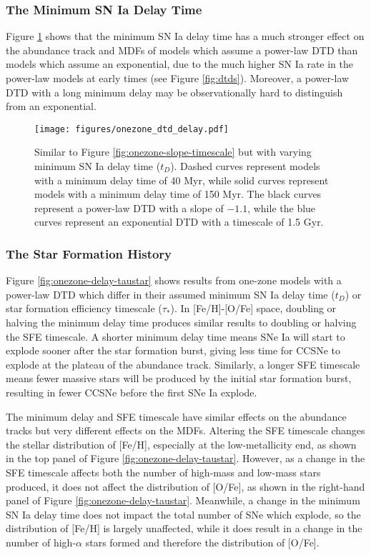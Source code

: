 \documentclass[twocolumn]{aastex631}
\begin{document}
\subsubsection{The Minimum SN Ia Delay Time}

Figure \ref{fig:onezone-dtd-delay} shows that the minimum SN Ia delay time has a much stronger effect on the abundance track and MDFs of models which assume a power-law DTD than models which assume an exponential, due to the much higher SN Ia rate in the power-law models at early times (see Figure \ref{fig:dtds}). Moreover, a power-law DTD with a long minimum delay may be observationally hard to distinguish from an exponential. 

\begin{figure}
    \centering
    \texttt{[image: figures/onezone\_dtd\_delay.pdf]}
    \caption{Similar to Figure \ref{fig:onezone-slope-timescale} but with varying minimum SN Ia delay time ($t_D$). Dashed curves represent models with a minimum delay time of 40 Myr, while solid curves represent models with a minimum delay time of 150 Myr. The black curves represent a power-law DTD with a slope of $-1.1$, while the blue curves represent an exponential DTD with a timescale of 1.5 Gyr.}
    \label{fig:onezone-dtd-delay}
\end{figure}

\subsubsection{The Star Formation History}

Figure \ref{fig:onezone-delay-taustar} shows results from one-zone models with a power-law DTD which differ in their assumed minimum SN Ia delay time ($t_D$) or star formation efficiency timescale ($\tau_*$). In [Fe/H]-[O/Fe] space, doubling or halving the minimum delay time produces similar results to doubling or halving the SFE timescale. A shorter minimum delay time means SNe Ia will start to explode sooner after the star formation burst, giving less time for CCSNe to explode at the plateau of the abundance track. Similarly, a longer SFE timescale means fewer massive stars will be produced by the initial star formation burst, resulting in fewer CCSNe before the first SNe Ia explode. 

The minimum delay and SFE timescale have similar effects on the abundance tracks but very different effects on the MDFs. Altering the SFE timescale changes the stellar distribution of [Fe/H], especially at the low-metallicity end, as shown in the top panel of Figure \ref{fig:onezone-delay-taustar}. However, as a change in the SFE timescale affects both the number of high-mass and low-mass stars produced, it does not affect the distribution of [O/Fe], as shown in the right-hand panel of Figure \ref{fig:onezone-delay-taustar}. Meanwhile, a change in the minimum SN Ia delay time does not impact the total number of SNe which explode, so the distribution of [Fe/H] is largely unaffected, while it does result in a change in the number of high-$\alpha$ stars formed and therefore the distribution of [O/Fe].
\end{document}
